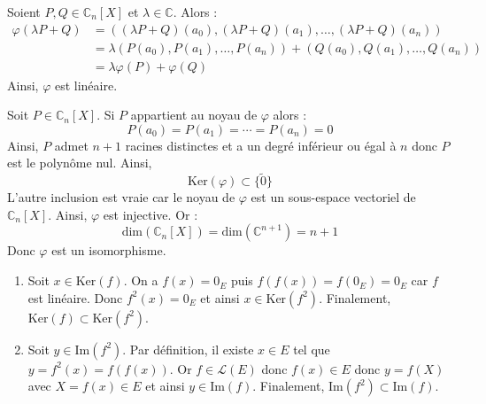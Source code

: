 \documentclass[a4paper,twoside,french,11pt]{VcCours}
\begin{document}
\begin{Exercice}{}\end{Exercice}Soient $P,Q \in \mathbb{C}_n[X]$ et $\lambda \in \mathbb{C}$. Alors :
\begin{align*}
\varphi(\lambda P + Q ) & = ((\lambda P+Q)(a_{0}),(\lambda P+Q)(a_{1}), \ldots , (\lambda P+Q)(a_{n})) \\
& = \lambda (P(a_{0}),P(a_{1}), \ldots ,P(a_{n})) + (Q(a_{0}),Q(a_{1}), \ldots ,Q(a_{n})) \\
& = \lambda \varphi(P) + \varphi(Q)
\end{align*}
Ainsi, $\varphi$ est linéaire.



\noindent Soit $P \in \mathbb{C}_n[X]$. Si $P$ appartient au noyau de $\varphi$ alors :
$$ P(a_0) = P(a_1) = \cdots = P(a_n) = 0$$
Ainsi, $P$ admet $n+1$ racines distinctes et a un degré inférieur ou égal à $n$ donc $P$ est le polynôme nul. Ainsi,
$$ \textrm{Ker}(\varphi) \subset \lbrace \tilde{0} \rbrace$$
L'autre inclusion est vraie car le noyau de $\varphi$ est un sous-espace vectoriel de $\mathbb{C}_n[X]$. Ainsi, $\varphi$ est injective. Or :
$$ \textrm{dim}(\mathbb{C}_n[X]) = \textrm{dim}(\mathbb{C}^{n+1}) = n+1$$
Donc $\varphi$ est un isomorphisme.





\begin{Exercice}{}\end{Exercice}

\begin{enumerate}
\item Soit $x \in \textrm{Ker}(f)$. On a $f(x)=0_E$ puis $f(f(x))=f(0_E)=0_E$ car $f$ est linéaire. Donc $f^2(x)=0_E$ et ainsi $x \in \textrm{Ker}(f^2)$. Finalement, $\textrm{Ker}(f) \subset \textrm{Ker}(f^2)$.
\item Soit $y \in \textrm{Im}(f^2)$. Par définition, il existe $x \in E$ tel que $y=f^2(x)=f(f(x))$. Or $f \in \mathcal{L}(E)$ donc $f(x) \in E$ donc $y=f(X)$ avec $X = f(x) \in E$ et ainsi $y \in \textrm{Im}(f)$. Finalement, $\textrm{Im}(f^2) \subset \textrm{Im}(f)$.
\end{enumerate}



\begin{Exercice}{}\end{Exercice}
\end{document}
